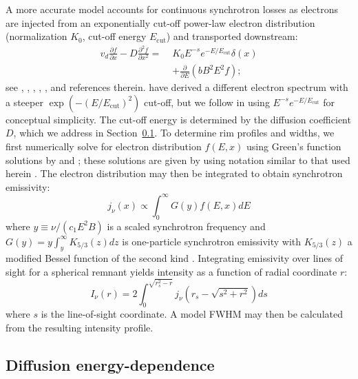 \documentclass[iop, apj, numberedappendix]{emulateapj}
\newcommand*{\mt}{\mathrm}
\newcommand*{\ptl}{\partial}
\newcommand*{\Ecut}{E_{\mt{cut}}}
\begin{document}
A more accurate model accounts for continuous synchrotron losses as electrons
are injected from an exponentially cut-off power-law electron distribution
(normalization $K_0$, cut-off energy $\Ecut$) and transported downstream:
\begin{align} \label{eq:full-mod}
    v_d \frac{\ptl f}{\ptl x} - D \frac{\ptl^2 f}{\ptl x^2} =\;
    &K_0 E^{-s} e^{-E/\Ecut} \delta(x) \nonumber \\
    &+ \frac{\ptl}{\ptl E} \left(bB^2E^2f\right) ;
\end{align}
see \citet{webb1984}, \citet{berezhko2004}, \citet{cassam-chenai2007},
\citet{morlino2010}, \citet{rettig2012}, and references therein.
\citet{zirakashvili2007} have derived a different electron spectrum with a
steeper $\exp\left(- \left(E/\Ecut\right)^2\right)$ cut-off, but we follow
 in using $E^{-s} e^{-E/\Ecut}$ for conceptual
simplicity.  The cut-off energy is determined by the diffusion coefficient $D$,
which we address in Section~\ref{sec:diffcoeff}.  To determine rim profiles and
widths, we first numerically solve for electron distribution $f(E,x)$ using
Green's function solutions by \citet{lerche1980} and \citet{rettig2012}; these
solutions are given by  using notation similar to that
used herein .  The electron distribution may then be
integrated to obtain synchrotron emissivity:
\begin{equation} \label{eq:emissivity}
    j_{\nu}(x) \propto \int_0^\infty G(y) f(E,x) dE
\end{equation}
where $y \equiv \nu/(c_1 E^2 B)$ is a scaled synchrotron frequency and
$G(y) = y \int_y^\infty K_{5/3}(z) dz$ is one-particle synchrotron emissivity
with $K_{5/3}(z)$ a modified Bessel function of the second kind
\citep{pacholczyk1970}.  Integrating emissivity over lines of sight for a
spherical remnant yields intensity as a function of radial coordinate $r$:
\begin{equation} \label{eq:intensity}
    I_{\nu}(r) = 2 \int_0^{\sqrt{r_s^2 - r}}
                    j_{\nu} \left( r_s - \sqrt{s^2 + r^2} \right) ds
\end{equation}
where $s$ is the line-of-sight coordinate.  A model FWHM may then be calculated
from the resulting intensity profile.

\subsection{Diffusion energy-dependence} \label{sec:diffcoeff}
\end{document}
